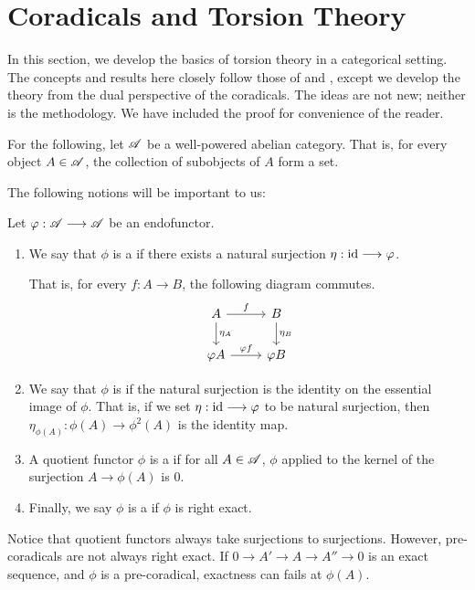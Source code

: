 \newpage
\section{Coradicals and Torsion Theory}\label{sect_torsion_theory}

In this section, we develop the basics of torsion theory in a 
categorical setting. The concepts and results here closely follow
those of \cite{BJV} and \cite{DTor}, except we develop the theory
from the dual perspective of the coradicals. The ideas are not new;
neither is the methodology. We have included the proof for 
convenience of the reader.

For the following, let $\mathscr{A}$ be a well-powered abelian category.
That is, for every object $A \in \mathscr{A}$, the collection of 
subobjects of $A$ form a set.

The following notions will be important to us:

\begin{defn}\label{def_coradical}
Let $\varphi: \mathscr{A} \longrightarrow \mathscr{A}$ be an endofunctor. 
\begin{enumerate}
\item We say that $\phi$ is a  if there 
exists a natural surjection $\eta: \mathrm{id} \longrightarrow \varphi$. 

That is, for every $f: A \to B$, the following diagram commutes.
\[
\begin{tikzcd}
A \arrow{r}{f} \arrow{d}{\eta_A} &
B \arrow{d}{\eta_B} \\
\phi A \arrow{r}{\phi f} 
&\phi B
\end{tikzcd}
\]

\item We say that $\phi$ is  if the natural 
surjection is the identity on the essential image of $\phi$.
That is, if we set $\eta: \mathrm{id} \longrightarrow \varphi$ to be natural surjection,
then $\eta_{\phi(A)}: \phi(A) \to \phi^2(A)$ is the identity map.

\item A quotient functor $\phi$ is a  if for all
$A \in \mathscr{A}$, $\phi$ applied to the kernel of the surjection 
$A \to \phi(A)$ is $0$.

\item Finally, we say $\phi$ is a  if $\phi$ is
right exact.
\end{enumerate}
\end{defn}

\begin{rmk}
Notice that quotient functors always take surjections to 
surjections. However, pre-coradicals are not always right exact.
If $0 \to A' \to A \to A'' \to 0$ is an exact sequence, and $\phi$
is a pre-coradical, exactness can fails at $\phi(A)$.
\end{rmk}

